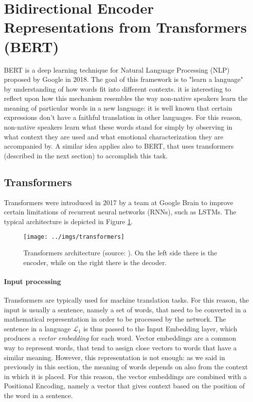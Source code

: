 \documentclass[12pt,a4paper]{book}
\theoremstyle{definition}
\begin{document}
	\section{Bidirectional Encoder Representations from Transformers (BERT)}
	BERT \cite{Devlin2018} is a deep learning technique for Natural Language Processing (NLP) proposed by Google in 2018. The goal of this framework is to "learn a language" by understanding of how words fit into different contexts. it is interesting to reflect upon how this mechanism resembles the way non-native speakers learn the meaning of particular words in a new language: it is well known that certain expressions don't have a faithful translation in other languages. For this reason, non-native speakers learn what these words stand for simply by observing in what context they are used and what emotional characterization they are accompanied by. A similar idea applies also to BERT, that uses transformers (described in the next section) to accomplish this task.
	
	\subsection{Transformers}
	Transformers \cite{Vaswani2017} were introduced in 2017 by a team at Google Brain to improve certain limitations of recurrent neural networks (RNNs), such as LSTMs. The typical architecture is depicted in Figure \ref{fig:transformer}.
	\begin{figure}
		\centering
		\texttt{[image: ../imgs/transformers]}
		\captionsetup{width=.7\linewidth}
		\caption{Transformers architecture (source: \cite{Vaswani2017}). On the left side there is the encoder, while on the right there is the decoder.}
		\label{fig:transformer}
	\end{figure}
	
	\paragraph{Input processing}
	Transformers are typically used for machine translation tasks. For this reason, the input is usually a sentence, namely a set of words, that need to be converted in a mathematical representation in order to be processed by the network. The sentence in a language $\mathcal{L}_1$ is thus passed to the Input Embedding layer, which produces a \textit{vector embedding} for each word. Vector embeddings are a common way to represent words, that tend to assign close vectors to words that have a similar meaning. However, this representation is not enough: as we said in previously in this section, the meaning of words depends on also from the context in which it is placed. For this reason, the vector embeddings are combined with a Positional Encoding, namely a vector that gives context based on the position of the word in a sentence. 
	
\end{document}
